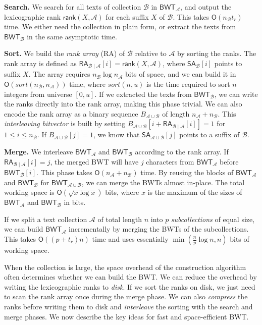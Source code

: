 \documentclass[smallabstract,smallcaptions]{dccpaper}
\newcommand{\Oh}{\ensuremath{\mathsf{O}}}
\newcommand{\BWT}{\textsf{BWT}}
\newcommand{\RA}{\textsf{RA}}
\newcommand{\mSA}{\ensuremath{\mathsf{SA}}}
\newcommand{\mBWT}{\ensuremath{\mathsf{BWT}}}
\newcommand{\mRA}{\ensuremath{\mathsf{RA}}}
\newcommand{\mrank}{\ensuremath{\mathsf{rank}}}
\newcommand{\Acoll}{\ensuremath{\mathcal{A}}}
\newcommand{\Bcoll}{\ensuremath{\mathcal{B}}}
\begin{document}
\smallbreak\noindent\textbf{Search.} We search for all texts of collection $\Bcoll$ in $\mBWT_{\Acoll}$, and output the lexicographic rank $\mrank(X, \Acoll)$ for each suffix $X$ of $\Bcoll$. This takes $\Oh(n_{\Bcoll} t_{r})$ time. We either need the collection in plain form, or extract the texts from $\mBWT_{\Bcoll}$ in the same asymptotic time.

\smallbreak\noindent\textbf{Sort.} We build the \emph{rank array} (\RA) of $\Bcoll$ relative to $\Acoll$ by sorting the ranks. The rank array is defined as $\mRA_{\Bcoll \mid \Acoll}[i] = \mrank(X, \Acoll)$, where $\mSA_{\Bcoll}[i]$ points to suffix $X$. The array requires $n_{\Bcoll} \log n_{\Acoll}$ bits of space, and we can build it in $\Oh(sort(n_{\Bcoll}, n_{\Acoll}))$ time, where $sort(n, u)$ is the time required to sort $n$ integers from universe $[0,u]$. If we extracted the texts from $\mBWT_{\Bcoll}$, we can write the ranks directly into the rank array, making this phase trivial. We can also encode the rank array as a binary sequence $B_{\Acoll \cup \Bcoll}$ of length $n_{\Acoll} + n_{\Bcoll}$. This \emph{interleaving bitvector} is built by setting $B_{\Acoll \cup \Bcoll}[i + \mRA_{\Bcoll \mid \Acoll}[i]] = 1$ for $1 \le i \le n_{\Bcoll}$. If $B_{\Acoll \cup \Bcoll}[j] = 1$, we know that $\mSA_{\Acoll \cup \Bcoll}[j]$ points to a suffix of $\Bcoll$.

\smallbreak\noindent\textbf{Merge.} We interleave $\mBWT_{\Acoll}$ and $\mBWT_{\Bcoll}$ according to the rank array. If $\mRA_{\Bcoll \mid \Acoll}[i] = j$, the merged \BWT{} will have $j$ characters from $\mBWT_{\Acoll}$ before $\mBWT_{\Bcoll}[i]$. This phase takes $\Oh(n_{\Acoll} + n_{\Bcoll})$ time. By reusing the blocks of $\mBWT_{\Acoll}$ and $\mBWT_{\Bcoll}$ for $\mBWT_{\Acoll \cup \Bcoll}$, we can merge the \BWT{}s almost in-place. The total working space is $\Oh(\sqrt{x \log x})$ bits, where $x$ is the maximum of the sizes of $\mBWT_{\Acoll}$ and $\mBWT_{\Bcoll}$ in bits.


\Section{Large-scale \BWT{} merging}

If we split a text collection $\Acoll$ of total length $n$ into $p$ \emph{subcollections} of equal size, we can build $\mBWT_{\Acoll}$ incrementally by merging the \BWT{}s of the subcollections. This takes $\Oh((p+t_{r})n)$ time and uses essentially $\min(\frac{n}{p} \log n, n)$ bits of working space.

When the collection is large, the space overhead of the construction algorithm often determines whether we can build the \BWT{}.
%
We can reduce the overhead by writing the lexicographic ranks to \emph{disk}. If we sort the ranks on disk, we just need to scan the rank array once during the merge phase. We can also \emph{compress} the ranks before writing them to disk and \emph{interleave} the sorting with the search and merge phases. We now describe the key ideas for fast and space-efficient \BWT{}.
\end{document}
